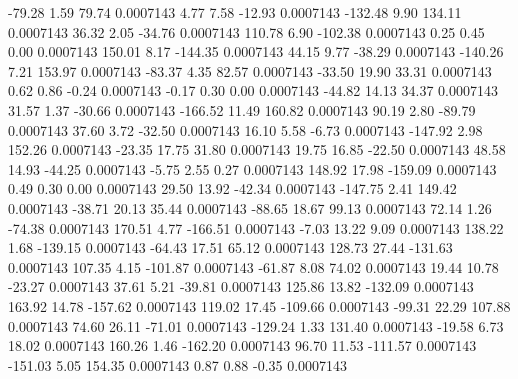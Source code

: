       -79.28        1.59       79.74     0.0007143
        4.77        7.58      -12.93     0.0007143
     -132.48        9.90      134.11     0.0007143
       36.32        2.05      -34.76     0.0007143
      110.78        6.90     -102.38     0.0007143
        0.25        0.45        0.00     0.0007143
      150.01        8.17     -144.35     0.0007143
       44.15        9.77      -38.29     0.0007143
     -140.26        7.21      153.97     0.0007143
      -83.37        4.35       82.57     0.0007143
      -33.50       19.90       33.31     0.0007143
        0.62        0.86       -0.24     0.0007143
       -0.17        0.30        0.00     0.0007143
      -44.82       14.13       34.37     0.0007143
       31.57        1.37      -30.66     0.0007143
     -166.52       11.49      160.82     0.0007143
       90.19        2.80      -89.79     0.0007143
       37.60        3.72      -32.50     0.0007143
       16.10        5.58       -6.73     0.0007143
     -147.92        2.98      152.26     0.0007143
      -23.35       17.75       31.80     0.0007143
       19.75       16.85      -22.50     0.0007143
       48.58       14.93      -44.25     0.0007143
       -5.75        2.55        0.27     0.0007143
      148.92       17.98     -159.09     0.0007143
        0.49        0.30        0.00     0.0007143
       29.50       13.92      -42.34     0.0007143
     -147.75        2.41      149.42     0.0007143
      -38.71       20.13       35.44     0.0007143
      -88.65       18.67       99.13     0.0007143
       72.14        1.26      -74.38     0.0007143
      170.51        4.77     -166.51     0.0007143
       -7.03       13.22        9.09     0.0007143
      138.22        1.68     -139.15     0.0007143
      -64.43       17.51       65.12     0.0007143
      128.73       27.44     -131.63     0.0007143
      107.35        4.15     -101.87     0.0007143
      -61.87        8.08       74.02     0.0007143
       19.44       10.78      -23.27     0.0007143
       37.61        5.21      -39.81     0.0007143
      125.86       13.82     -132.09     0.0007143
      163.92       14.78     -157.62     0.0007143
      119.02       17.45     -109.66     0.0007143
      -99.31       22.29      107.88     0.0007143
       74.60       26.11      -71.01     0.0007143
     -129.24        1.33      131.40     0.0007143
      -19.58        6.73       18.02     0.0007143
      160.26        1.46     -162.20     0.0007143
       96.70       11.53     -111.57     0.0007143
     -151.03        5.05      154.35     0.0007143
        0.87        0.88       -0.35     0.0007143
